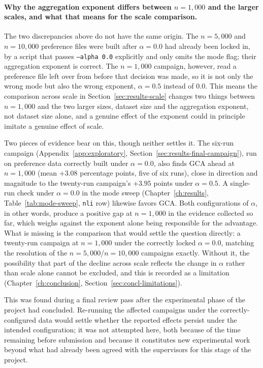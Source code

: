 \paragraph{Why the aggregation exponent differs between $n=1{,}000$ and the
larger scales, and what that means for the scale comparison.} The two
discrepancies above do not have the same origin. The $n=5{,}000$ and
$n=10{,}000$ preference files were built after $\alpha=0.0$ had already been
locked in, by a script that passes \texttt{--alpha 0.0} explicitly and only
omits the mode flag; their aggregation exponent is correct. The $n=1{,}000$
campaign, however, read a preference file left over from before that
decision was made, so it is not only the wrong mode but also the wrong
exponent, $\alpha=0.5$ instead of $0.0$. This means the comparison across
scale in Section~\ref{sec:results-scale} changes two things between
$n=1{,}000$ and the two larger sizes, dataset size and the aggregation
exponent, not dataset size alone, and a genuine effect of the exponent
could in principle imitate a genuine effect of scale.

Two pieces of evidence bear on this, though neither settles it. The six-run
campaign (Appendix~\ref{app:exploratory}, Section~\ref{sec:results-final-campaign}),
run on preference data correctly built under $\alpha=0.0$, also finds GCA
ahead at $n=1{,}000$ (mean $+3.08$ percentage points, five of six runs), close
in direction and magnitude to the twenty-run campaign's $+3.95$ points under
$\alpha=0.5$. A single-run check under $\alpha=0.0$ in the mode sweep
(Chapter~\ref{ch:results}, Table~\ref{tab:mode-sweep}, \texttt{nli} row)
likewise favors GCA. Both configurations of $\alpha$, in other words, produce
a positive gap at $n=1{,}000$ in the evidence collected so far, which weighs
against the exponent alone being responsible for the advantage. What is
missing is the comparison that would settle the question directly: a
twenty-run campaign at $n=1{,}000$ under the correctly locked $\alpha=0.0$,
matching the resolution of the $n=5{,}000$/$n=10{,}000$ campaigns exactly.
Without it, the possibility that part of the decline across scale reflects
the change in $\alpha$ rather than scale alone cannot be excluded, and this
is recorded as a limitation
(Chapter~\ref{ch:conclusion}, Section~\ref{sec:concl-limitations}).

This was found during a final review pass after the experimental phase of
the project had concluded. Re-running the affected campaigns under the
correctly-configured data would settle whether the reported effects persist
under the intended configuration; it was not attempted here, both because
of the time remaining before submission and because it constitutes new
experimental work beyond what had
already been agreed with the supervisors for this stage of the project.

